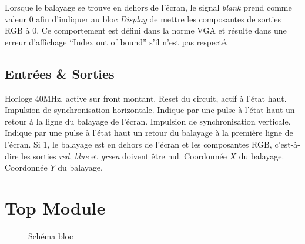 \documentclass[french]{nakrule}
\begin{document}
Lorsque le balayage se trouve en dehors de l'écran, le signal \emph{blank} prend
comme valeur 0 afin d'indiquer au bloc \emph{Display} de mettre les composantes
de sorties RGB à 0. Ce comportement est défini dans la norme VGA et résulte
dans une erreur d'affichage ``Index out of bound'' s'il n'est pas respecté.

\subsection{Entrées \& Sorties}
\label{subsec:Entrees_Sorties_vga}

\begin{descr}
   Horloge 40MHz, active sur front montant.
   Reset du circuit, actif à l'état haut.
   Impulsion de synchronisation horizontale. Indique par une pulse
  à l'état haut un retour à la ligne du balayage de l'écran.
   Impulsion de synchronisation verticale. Indique par une pulse à
  l'état haut un retour du balayage à la première ligne de l'écran.
   Si 1, le balayage est en dehors de l'écran et les
  composantes RGB, c'est-à-dire les sorties \emph{red}, \emph{blue} et
  \emph{green} doivent être nul.
   Coordonnée $X$ du balayage.
   Coordonnée $Y$ du balayage.
\end{descr}

\clearpage

\section{Top Module}
\label{sec:topmodule}

\begin{figure}
\caption{Schéma bloc}
\label{topModuleBloc}
\end{figure}
\end{document}
